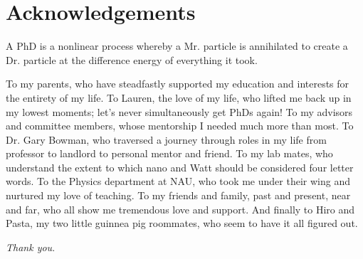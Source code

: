 \chapter*{Acknowledgements}
{}


A PhD is a nonlinear process whereby a Mr. particle is annihilated to create a Dr. particle at the difference energy of everything it took.

To my parents, who have steadfastly supported my education and interests for the entirety of my life. To Lauren, the love of my life, who lifted me back up in my lowest moments; let's never simultaneously get PhDs again! To my advisors and committee members, whose mentorship I needed much more than most. To Dr. Gary Bowman, who traversed a journey through roles in my life from professor to landlord to personal mentor and friend. To my lab mates, who understand the extent to which nano and Watt should be considered four letter words. To the Physics department at NAU, who took me under their wing and nurtured my love of teaching. To my friends and family, past and present, near and far, who all show me tremendous love and support. And finally to Hiro and Pasta, my two little guinnea pig roommates, who seem to have it all figured out.

\textit{Thank you}.

